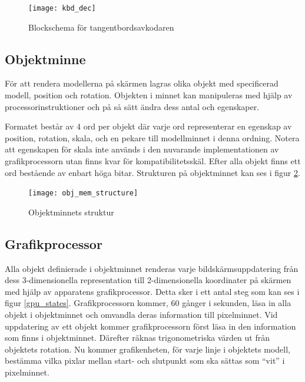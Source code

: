 \documentclass[a4paper]{article}
\begin{document}
    \begin{figure}[H]
        \centering
        \texttt{[image: kbd\_dec]}
        \caption{Blockschema för tangentbordsavkodaren}
        \label{fig:kbd_dec}
    \end{figure}

    \subsection{Objektminne}

    För att rendera modellerna på skärmen lagras olika objekt med specificerad
    modell, position och rotation. Objekten i minnet kan manipuleras med hjälp av
    processorinstruktioner och på så sätt ändra dess antal och egenskaper. 

    Formatet består av 4 ord per objekt där varje ord representerar en egenskap av
    position, rotation, skala, och en pekare till modellminnet i denna ordning.
    Notera att egenskapen för skala inte används i den nuvarande implementationen av
    grafikprocessorn utan finns kvar för kompatibilitetsskäl. Efter alla objekt
    finns ett ord bestående av enbart höga bitar. Strukturen på objektminnet kan ses
    i figur \ref{fig:obj_mem_structure}. 

    \begin{figure}[H]
        \centering
        \texttt{[image: obj\_mem\_structure]}
        \caption{Objektminnets struktur}
        \label{fig:obj_mem_structure}
    \end{figure}



    \subsection{Grafikprocessor}
    Alla objekt definierade i objektminnet renderas varje bildskärmsuppdatering från
    dess 3-dimensionella representation till 2-dimensionella koordinater på skärmen
    med hjälp av apparatens grafikprocessor. Detta sker i ett antal steg som kan ses
    i figur \ref{gpu_states}. 
    Grafikprocessorn kommer, 60 gånger i sekunden, läsa in alla objekt i
    objektminnet och omvandla deras information till pixelminnet. Vid uppdatering av
    ett objekt kommer grafikprocessorn först läsa in den information som finns i
    objektminnet. Därefter räknas trigonometriska värden ut från objektets rotation.
    Nu kommer grafikenheten, för varje linje i objektets modell, bestämma vilka
    pixlar mellan start- och slutpunkt som ska sättas som “vit” i pixelminnet. 
\end{document}
